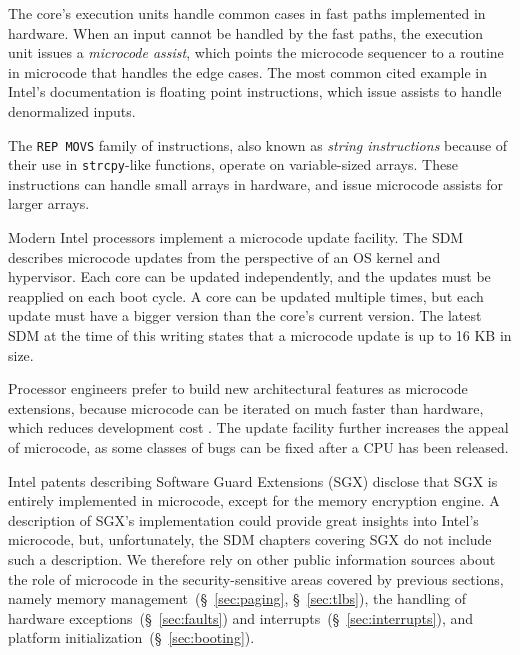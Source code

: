
The core's execution units handle common cases in fast paths implemented in
hardware. When an input cannot be handled by the fast paths, the execution
unit issues a \textit{microcode assist}, which points the microcode sequencer
to a routine in microcode that handles the edge cases. The most common cited
example in Intel's documentation is floating point instructions, which issue
assists to handle denormalized inputs.

The \texttt{REP MOVS} family of instructions, also known as \textit{string
instructions} because of their use in \texttt{strcpy}-like functions, operate
on variable-sized arrays. These instructions can handle small arrays in
hardware, and issue microcode assists for larger arrays.


Modern Intel processors implement a microcode update facility. The SDM
describes microcode updates from the perspective of an OS kernel and
hypervisor. Each core can be updated independently, and the updates must be
reapplied on each boot cycle. A core can be updated multiple times, but each
update must have a bigger version than the core's current version. The latest
SDM at the time of this writing states that a microcode update is up to 16 KB
in size.

Processor engineers prefer to build new architectural features as microcode
extensions, because microcode can be iterated on much faster than hardware,
which reduces development cost \cite{intel2008genetic, intel2012clusters}. The
update facility further increases the appeal of microcode, as some classes of
bugs can be fixed after a CPU has been released.

Intel patents \cite{intel2013patent1, intel2013patent2} describing Software
Guard Extensions (SGX) disclose that SGX is entirely implemented in microcode,
except for the memory encryption engine. A description of SGX's implementation
could provide great insights into Intel's microcode, but, unfortunately, the
SDM chapters covering SGX do not include such a description. We therefore rely
on other public information sources about the role of microcode in the
security-sensitive areas covered by previous sections, namely memory
management~(\S~\ref{sec:paging}, \S~\ref{sec:tlbs}), the handling of hardware
exceptions~(\S~\ref{sec:faults}) and interrupts~(\S~\ref{sec:interrupts}), and
platform initialization~(\S~\ref{sec:booting}).

